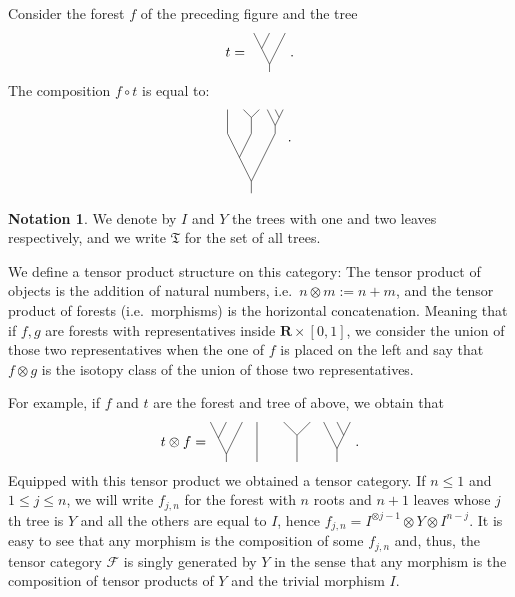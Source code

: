 \documentclass[a4paper,12pt]{amsart}
\numberwithin{equation}{section}
\theoremstyle{definition}
\newtheorem{notation}[theo]{Notation}
\newcommand{\cF}{\mathcal F}
\newcommand{\ot}{\otimes}\newcommand{\otmin}{\otimes_{\text{min}}}
\newcommand{\R}{\mathbf{R}}
\newcommand{\fT}{\mathfrak T}
\begin{document}
\newcommand{\compo}{
\begin{tikzpicture}[baseline = -.2cm, scale = .6]
\draw (1,-2)--(1,-2.5);
\draw (1,-2)--(0,0);
\draw (.5,-1)--(1,0);
\draw (1,-2)--(2,0);
%
\draw (0,0)--(0,1);
\draw (1,0)--(1,2/3);
\draw (1,2/3)--(2/3,1);
\draw (1,2/3)--(4/3,1);
\draw (2,0)--(2,1/3);
\draw (2,1/3)--(5/3,1);
\draw (2,1/3)--(7/3,1);
\draw (13/6,2/3)--(2,1);
\end{tikzpicture}
}
%
{Consider the forest $f$ of the preceding figure and the tree
$$t = \ \funfun\ .$$
The composition $f\circ t$ is equal to:
$$\begin{small}\compo\ .\end{small}$$
}
\begin{notation}We denote by $I$ and $Y$ the trees with one and two leaves respectively, and we write $\fT$ for the set of all trees.
\end{notation}
We define a tensor product structure on this category:
The tensor product of objects is the addition of natural numbers, i.e.~$n\otimes m := n+m$, and the tensor product of forests (i.e.~morphisms) is the horizontal concatenation.
Meaning that if $f,g$ are forests with representatives inside $\R\times [0,1]$, we consider the union of those two representatives when the one of $f$ is placed on the left and say that $f\otimes g$ is the isotopy class of the union of those two representatives.



{For example, if $f$ and $t$ are the forest and tree of above, we obtain that 
$$t\otimes f = \funfun \quad \forest \ .$$}
Equipped with this tensor product we obtained a tensor category.
If $n\leq 1$ and $1\leq j\leq n$, we will write $f_{j,n}$ for the forest with $n$ roots and $n+1$ leaves whose $j$th tree is $Y$ and all the others are equal to $I$, hence $f_{j,n} = I^{\ot j-1} \ot Y \ot I^{n-j}.$
It is easy to see that any morphism is the composition of some $f_{j,n}$ and, thus, the tensor category $\cF$ is singly generated by $Y$ in the sense that any morphism is the composition of tensor products of $Y$ and the trivial morphism $I$.
\end{document}
